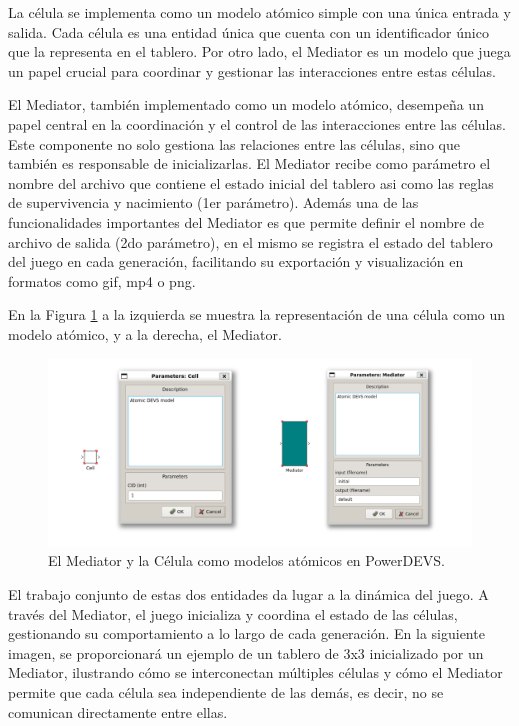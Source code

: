 \documentclass[]{article}
\begin{document}
La célula se implementa como un modelo atómico simple con una única entrada y salida. Cada célula es una entidad única que cuenta con un identificador único que la representa en el tablero. Por otro lado, el Mediator es un modelo que juega un papel crucial para coordinar y gestionar las interacciones entre estas células.

El Mediator, también implementado como un modelo atómico, desempeña un papel central en la coordinación y el control de las interacciones entre las células. Este componente no solo gestiona las relaciones entre las células, sino que también es responsable de inicializarlas. El Mediator recibe como parámetro el nombre del archivo que contiene el estado inicial del tablero asi como las reglas de supervivencia y nacimiento (1er parámetro). Además una de las funcionalidades importantes del Mediator es que permite definir el nombre de archivo de salida (2do parámetro), en el mismo se registra el estado del tablero del juego en cada generación, facilitando su exportación y visualización en formatos como gif, mp4 o png.

En la Figura \ref{fig:cell_mediator} a la izquierda se muestra la representación de una célula como un modelo atómico, y a la derecha, el Mediator.

\begin{figure}[H]
  \centering
  \includegraphics[width=1\textwidth]{../assets/pdevs/mediator_cell.png}
  \caption{El Mediator y la Célula como modelos atómicos en PowerDEVS.}
  \label{fig:cell_mediator}
\end{figure}

El trabajo conjunto de estas dos entidades da lugar a la dinámica del juego. A través del Mediator, el juego inicializa y coordina el estado de las células, gestionando su comportamiento a lo largo de cada generación. En la siguiente imagen, se proporcionará un ejemplo de un tablero de 3x3 inicializado por un Mediator, ilustrando cómo se interconectan múltiples células y cómo el Mediator permite que cada célula sea independiente de las demás, es decir, no se comunican directamente entre ellas.
\end{document}
